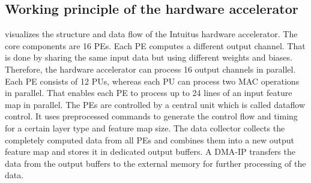 \documentclass[%
a4paper,
twoside,
openany,
dvipsnames
]
{report}
\let\svfigure\figure
\let\svendfigure\endfigure
\renewenvironment{figure}[1][tb]{\svfigure[#1]\setstretch{1}}
{\svendfigure}
\begin{document}
\subsection{Working principle of the hardware accelerator}
\begin{figure}[h]
	\centering
	
	\caption[Neural network hardware accelerator overview.]{Overview of all components used for the neural network hardware accelerator.}
	\label{fig:co-noc}
\end{figure} 
 visualizes the structure and data flow of the Intuitus hardware accelerator. The core components are 16 \glspl{PE}. Each \gls{PE} computes a different output channel. That is done by sharing the same input data but using different weights and biases. Therefore, the hardware accelerator can process 16 output channels in parallel. Each \gls{PE} consists of 12 \glspl{PU}, whereas each \gls{PU} can process two \gls{MAC} operations in parallel. That enables each \gls{PE} to process up to 24 lines of an input feature map in parallel. The \glspl{PE} are controlled by a central unit which is called dataflow control. It uses preprocessed commands to generate the control flow and timing for a certain layer type and feature map size. The data collector collects the completely computed data from all \glspl{PE} and combines them into a new output feature map and stores it in dedicated output buffers. A \gls{DMA}-IP transfers the data from the output buffers to the external memory for further processing of the data.\\ 
\end{document}
